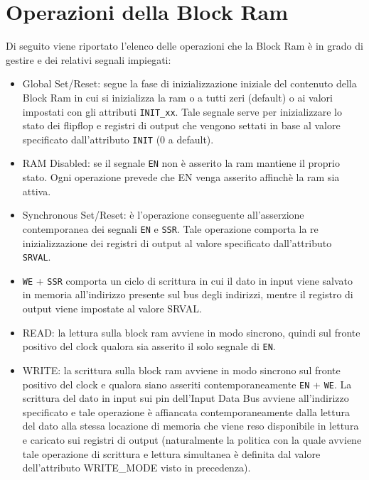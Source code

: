 \section{Operazioni della Block Ram}

Di seguito viene riportato l'elenco delle operazioni che la Block Ram  \`e in grado di gestire e dei relativi segnali impiegati:

\begin{itemize}
  \item Global Set/Reset: segue la fase di inizializzazione iniziale del contenuto della Block Ram in cui si inizializza la ram o a tutti zeri (default) o ai valori impostati con gli attributi \texttt{INIT\_xx}. Tale segnale serve per inizializzare lo stato dei flipflop e registri di output che vengono settati in base al valore specificato dall'attributo \texttt{INIT} (0 a default). 

\item RAM Disabled: se il segnale \texttt{EN} non  \`e asserito la ram mantiene il proprio stato. Ogni operazione prevede che EN venga asserito affinch\`e la ram sia attiva.

\item Synchronous Set/Reset: \`e l'operazione conseguente all'asserzione contemporanea dei segnali \texttt{EN} e \texttt{SSR}. Tale operazione comporta la re inizializzazione dei registri di output al valore specificato dall'attributo\texttt{ SRVAL}.

\item \texttt{WE} + \texttt{SSR} comporta un ciclo di scrittura in cui il dato in input viene salvato in memoria all'indirizzo presente sul bus degli indirizzi, mentre il registro di output viene impostate al valore SRVAL.

\item READ: la lettura sulla block ram avviene in modo sincrono, quindi sul fronte positivo del clock qualora sia asserito il solo segnale di \texttt{EN}.

\item WRITE: la scrittura sulla block ram avviene in modo sincrono sul fronte positivo del clock e qualora siano asseriti contemporaneamente \texttt{EN} + \texttt{WE}. La scrittura del dato in input sui pin dell'Input Data Bus avviene all'indirizzo specificato e tale operazione  \`e affiancata contemporaneamente dalla lettura del dato alla stessa locazione di memoria che viene reso disponibile in lettura e caricato sui registri di output (naturalmente la politica con la quale avviene tale operazione di scrittura e lettura simultanea  \`e definita dal valore dell'attributo WRITE\_MODE visto in precedenza).
\end{itemize}

